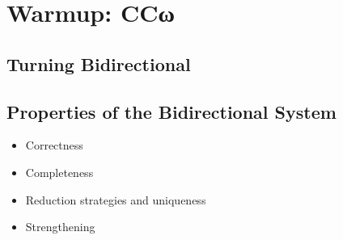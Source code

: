 \chapter{Warmup: CCω}
\label{chap:bidir-ccw}

\section{Turning  Bidirectional}
\label{sec:bidir-ccw}

\section{Properties of the Bidirectional System}
\label{sec:bidir-prop}

\begin{itemize}
  \item Correctness
  \item Completeness
  \item Reduction strategies and uniqueness
  \item Strengthening
\end{itemize}